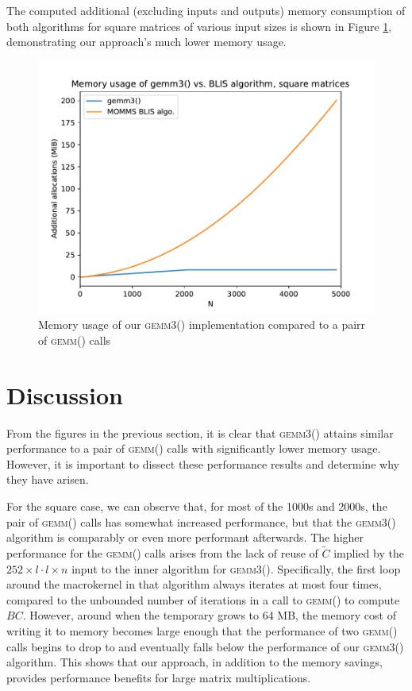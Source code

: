\documentclass[12pt]{article}
\newcommand*{\gemmt}{{\textsc{gemm3()}}}
\newcommand*{\gemm}{{\textsc{gemm()}}}
\begin{document}
The computed additional (excluding inputs and outputs) memory consumption of both algorithms for square matrices of various input sizes is shown in Figure \ref{fig:bc_square_mem}, demonstrating our approach's much lower memory usage.
\begin{figure}
  \centering
  \includegraphics[height=0.40\textheight]{../results/earwig2/gemm3_memory}
  \caption{Memory usage of our \gemmt{} implementation compared to a pairr of \gemm{} calls}
  \label{fig:bc_square_mem}
\end{figure}

\section{Discussion}
From the figures in the previous section, it is clear that \gemmt{} attains similar performance to a pair of \gemm{} calls with significantly lower memory usage.
However, it is important to dissect these performance results and determine why they have arisen.

For the square case, we can observe that, for most of the 1000s and 2000s, the pair of \gemm{} calls has somewhat increased performance, but that the \gemmt{} algorithm is comparably or even more performant afterwards.
The higher performance for the \gemm{} calls arises from the lack of reuse of $\tilde{C}$ implied by the $252 \times l \cdot l \times n$ input to the inner algorithm for \gemmt{}.
Specifically, the first loop around the macrokernel in that algorithm always iterates at most four times, compared to the unbounded number of iterations in a call to \gemm{} to compute $BC$.
However, around when the temporary grows to 64 MB, the memory cost of writing it to memory becomes large enough that the performance of two \gemm{} calls begins to drop to and eventually falls below the performance of our \gemmt{} algorithm.
This shows that our approach, in addition to the memory savings, provides performance benefits for large matrix multiplications.
\end{document}
